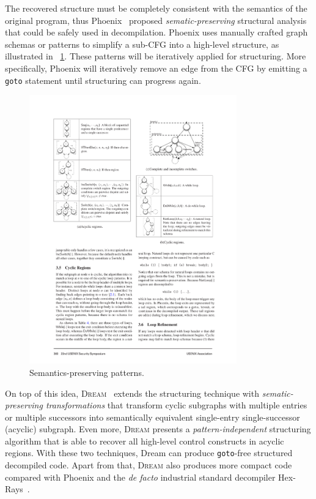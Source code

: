 The recovered structure must be completely consistent with the semantics of the original program, thus Phoenix~\cite{brumley2013native} proposed \textit{sematic-preserving} structural analysis that could be safely used in decompilation.
Phoenix uses manually crafted graph schemas or patterns to simplify a sub-CFG into a high-level structure, as illustrated in \F~\ref{fig:patterns}. These patterns will be iteratively applied for structuring. More specifically, Phoenix will iteratively remove an edge from the CFG by emitting a \texttt{goto} statement until structuring can progress again.

\begin{figure}[tb]
  \centering
  \includegraphics[width=0.8\textwidth]{fig/patterns.pdf}
  \caption{Semantics-preserving patterns.~\cite{brumley2013native}}
  \label{fig:patterns}
\end{figure}

On top of this idea, \textsc{Dream}~\cite{yakdan2015no} extends the structuring technique with \textit{sematic-preserving transformations} that transform cyclic subgraphs with multiple entries or multiple successors into semantically equivalent single-entry single-successor (acyclic) subgraph. Even more, \textsc{Dream} presents a \textit{pattern-independent} structuring algorithm that is able to recover all high-level control constructs in acyclic regions. With these two techniques, Dream can produce \texttt{goto}-free structured decompiled code. Apart from that, \textsc{Dream} also produces more compact code compared with Phoenix and the \textit{de facto} industrial standard decompiler Hex-Rays~\cite{hex2014ida}.

